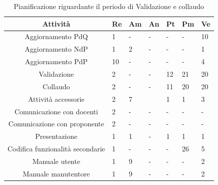\begin{table}[H]
	\centering
	\renewcommand{\arraystretch}{1.5}
	\begin{tabular}{|c|p{10mm}|p{10mm}|p{10mm}|p{10mm}|p{10mm}|p{10mm}|}
		\hline
		\rowcolor{lighter-grayer}
		Attività & Re & Am & An & Pt & Pm & Ve \\ \hline
		Aggiornamento PdQ                                                           & 1           &    -         &      -       &     -        &     -        & 10          \\ \hline
		Aggiornamento NdP                                                           & 1           & 2           &    -         &     -        &      -       & 1           \\ \hline
		Aggiornamento PdP                                                           & 10          &     -        &    -         &     -        &    -         & 4           \\ \hline
		Validazione                                                                 & 2           &   -          &       -      & 12          & 21          & 20          \\ \hline
		Collaudo                                                                    & 2           &     -        &     -        & 11          & 20          & 20          \\ \hline
		Attività accessorie & 2           & 7           &             & 1           & 1           & 3           \\ \hline
		Comunicazione con docenti                                                   & 2           &     -        &      -       &     -        &      -       &     -        \\ \hline
		Comunicazione con proponente                                                & 2           &    -         &       -      &   -          &     -        &    -         \\ \hline
		Presentazione                                                               & 1           & 1           &    -         & 1           & 1           & 1           \\ \hline
		Codifica funzionalità secondarie                                            & 1           &    -         &      -       &    -        & 26          & 5           \\ \hline
		Manuale utente                                                              & 1           & 9           &     -        &    -         &     -        & 2           \\ \hline
		Manuale manutentore                                                         & 1           & 9           &      -       &      -       &     -        & 2           \\ \hline
	\end{tabular}
	\caption{ Pianificazione riguardante il periodo di Validazione e collaudo\\}
\end{table}

